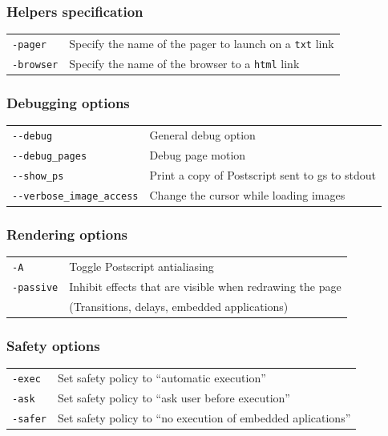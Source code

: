 \documentclass[12pt]{article}
\begin{document}
\subsubsection*{Helpers specification}

\medskip\noindent\begin{tabular}{ll}
\verb"-pager" & Specify the name of the pager to launch on a \verb"txt" link\\
\verb"-browser" & Specify the name of the browser to a \verb"html" link\\
\end{tabular}

\subsubsection*{Debugging options}

\medskip\noindent\begin{tabular}{ll}
\verb"--debug" & General debug option \\
\verb"--debug_pages" & Debug page motion \\
\verb"--show_ps" & Print a copy of Postscript sent to gs to stdout \\
\verb"--verbose_image_access" & Change the cursor while loading images\\
\end{tabular}

\subsubsection*{Rendering options}

\medskip\noindent\begin{tabular}{ll}
\verb"-A" & Toggle Postscript antialiasing \\
\verb"-passive" & Inhibit effects that are visible when redrawing the page
\\ & (Transitions, delays, embedded applications) \\
\end{tabular}

\subsubsection*{Safety options}
\medskip\noindent\begin{tabular}{ll}
\verb"-exec" & Set safety policy to ``automatic execution'' \\
\verb"-ask" & Set safety policy to ``ask user before execution'' \\
\verb"-safer" & Set safety policy to ``no execution of embedded aplications''
\end{tabular}
\end{document}
